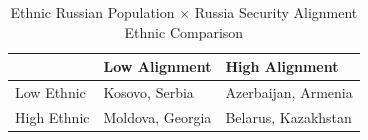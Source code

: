 \begin{table}[!t]
\caption*{
{\large Ethnic Russian Population × Russia Security Alignment} \\ 
{\small Ethnic Comparison}
} 
\fontsize{12.0pt}{14.4pt}\selectfont
\begin{tabular*}{\linewidth}{@{\extracolsep{\fill}}lll}
\toprule
 & Low Alignment & High Alignment \\ 
\midrule\addlinespace[2.5pt]
Low Ethnic & {Kosovo, Serbia} & {Azerbaijan, Armenia} \\ 
High Ethnic & {Moldova, Georgia} & {Belarus, Kazakhstan} \\ 
\bottomrule
\end{tabular*}
\end{table}

